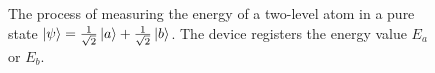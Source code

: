 \begin{figure}
\centering



\caption{The process of measuring the energy of a two-level atom in a pure state $\left|\psi\right> = 
\frac{1}{\sqrt{2}}\ket{a} + \frac{1}{\sqrt{2}}\ket{b}$.
The device registers the energy value $E_a$ or $E_b$.
}
\label{fig:add:mesure_ex}
\end{figure}